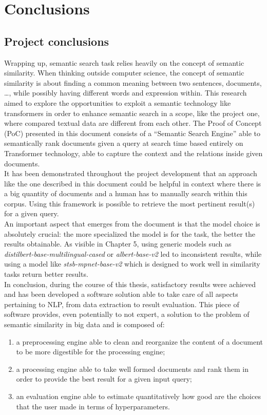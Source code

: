 \documentclass[\main/main.tex]{subfiles}
\begin{document}
\chapter{Conclusions}
\section{Project conclusions}
Wrapping up, semantic search task relies heavily on the concept of semantic similarity. When thinking outside computer science, the concept of semantic similarity is about finding a common meaning between two sentences, documents, \dots, while possibly having different words and expression within. This research aimed to explore the opportunities to exploit a semantic technology like transformers in order to enhance semantic search in a scope, like the project one, where compared textual data are different from each other.
The Proof of Concept (PoC) presented in this document consists of a ``Semantic Search Engine'' able to semantically rank documents given a query at search time based entirely on Transformer technology, able to capture the context and the relations inside given documents. \\
It has been demonstrated throughout the project development that an approach like the one described in this document could be helpful in context where there is a big quantity of documents and a human has to manually search within this corpus. Using this framework is possible to retrieve the most pertinent result(s) for a given query. \\
An important aspect that emerges from the document is that the model choice is absolutely crucial: the more specialized the model is for the task, the better the results obtainable. As visible in Chapter 5, using generic models such as \emph{distilbert-base-multilingual-cased} or \emph{albert-base-v2} led to inconsistent results, while using a model like \emph{stsb-mpnet-base-v2} which is designed to work well in similarity tasks return better results. \\
In conclusion, during the course of this thesis, satisfactory results were achieved and has been developed a software solution able to take care of all aspects pertaining to NLP, from data extraction to result evaluation. This piece of software provides, even potentially to not expert, a solution to the problem of semantic similarity in big data and is composed of:
\begin{enumerate}
    \item a preprocessing engine able to clean and reorganize the content of a document to be more digestible for the processing engine;
    \item a processing engine able to take well formed documents and rank them in order to provide the best result for a given input query;
    \item an evaluation engine able to estimate quantitatively how good are the choices that the user made in terms of hyperparameters.
\end{enumerate}
\end{document}
